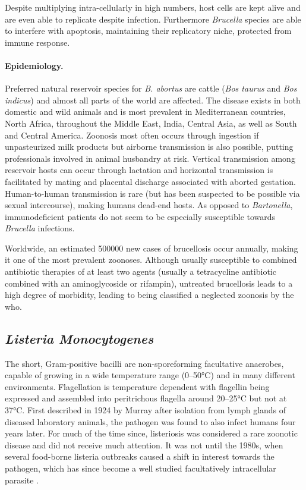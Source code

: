 Despite multiplying intra-cellularly in high numbers, host cells are kept alive and are even able to replicate despite infection. Furthermore \textit{Brucella} species are able to interfere with apoptosis, maintaining their replicatory niche, protected from immune response.

\paragraph{Epidemiology.}
Preferred natural reservoir species for \textit{B. abortus} are cattle (\textit{Bos taurus} and \textit{Bos indicus}) and almost all parts of the world are affected. The disease exists in both domestic and wild animals and is most prevalent in Mediterranean countries, North Africa, throughout the Middle East, India, Central Asia, as well as South and Central America. Zoonosis most often occurs through ingestion if unpasteurized milk products but airborne transmission is also possible, putting professionals involved in animal husbandry at risk. Vertical transmission among reservoir hosts can occur through lactation and horizontal transmission is facilitated by mating and placental discharge associated with aborted gestation. Human-to-human transmission is rare (but has been suspected to be possible via sexual intercourse), making humans dead-end hosts. As opposed to \textit{Bartonella}, immunodeficient patients do not seem to be especially susceptible towards \textit{Brucella} infections.

Worldwide, an estimated 500000 new cases of brucellosis occur annually, making it one of the most prevalent zoonoses. Although usually susceptible to combined antibiotic therapies of at least two agents (usually a tetracycline antibiotic combined with an aminoglycoside or rifampin), untreated brucellosis leads to a high degree of morbidity, leading to being classified a neglected zoonosis by the \gls{who}.

\subsection{\textit{Listeria Monocytogenes}}

The short, Gram-positive bacilli are non-sporeforming facultative anaerobes, capable of growing in a wide temperature range (0--50\si{\degree}C) and in many different environments. Flagellation is temperature dependent with flagellin being expressed and assembled into peritrichous flagella around 20--25\si{\degree}C but not at 37\si{\degree}C. First described in 1924 by Murray after isolation from lymph glands of diseased laboratory animals, the pathogen was found to also infect humans four years later. For much of the time since, listeriosis was considered a rare zoonotic disease and did not receive much attention. It was not until the 1980s, when several food-borne listeria outbreaks caused a shift in interest towards the pathogen, which has since become a well studied facultatively intracellular parasite \citep{Farber1991}.

